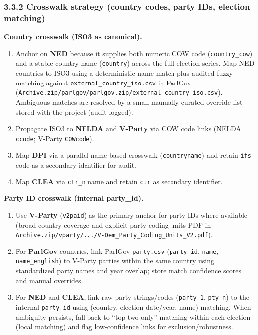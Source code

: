 \documentclass[11pt]{article}
\newcommand{\1}{\mathbf{1}}
\begin{document}
\subsubsection*{3.3.2 Crosswalk strategy (country codes, party IDs, election matching)}
\textbf{Country crosswalk (ISO3 as canonical).}
\begin{enumerate}[leftmargin=1.2em]
\item Anchor on \textbf{NED} because it supplies both numeric COW code (\texttt{country\_cow}) and a stable country name (\texttt{country}) across the full election series. Map NED countries to ISO3 using a deterministic name match plus audited fuzzy matching against \texttt{external\_country\_iso.csv} in ParlGov (\texttt{Archive.zip/parlgov/parlgov.zip/external\_country\_iso.csv}). Ambiguous matches are resolved by a small manually curated override list stored with the project (audit-logged).
\item Propagate ISO3 to \textbf{NELDA} and \textbf{V-Party} via COW code links (NELDA \texttt{ccode}; V-Party \texttt{COWcode}).
\item Map \textbf{DPI} via a parallel name-based crosswalk (\texttt{countryname}) and retain \texttt{ifs} code as a secondary identifier for audit.
\item Map \textbf{CLEA} via \texttt{ctr\_n} name and retain \texttt{ctr} as secondary identifier.
\end{enumerate}

\textbf{Party ID crosswalk (internal party\_id).}
\begin{enumerate}[leftmargin=1.2em]
\item Use \textbf{V-Party} (\texttt{v2paid}) as the primary anchor for party IDs where available (broad country coverage and explicit party coding units PDF in \texttt{Archive.zip/vparty/.../V-Dem\_Party\_Coding\_Units\_V2.pdf}).
\item For \textbf{ParlGov} countries, link ParlGov \texttt{party.csv} (\texttt{party\_id}, \texttt{name}, \texttt{name\_english}) to V-Party parties within the same country using standardized party names and year overlap; store match confidence scores and manual overrides.
\item For \textbf{NED} and \textbf{CLEA}, link raw party strings/codes (\texttt{party\_1}, \texttt{pty\_n}) to the internal \texttt{party\_id} using (country, election date/year, name) matching. When ambiguity persists, fall back to ``top-two only'' matching within each election (local matching) and flag low-confidence links for exclusion/robustness.
\end{enumerate}
\end{document}
